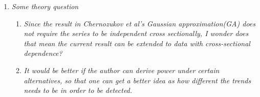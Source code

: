 \documentclass[a4paper,12pt]{article}
\begin{document}
\begin{enumerate}[label=(\arabic*),leftmargin=0.7cm]


  


\item \textit{Some theory question}

\begin{enumerate}[label=(\roman*)]
\item \textit{Since the result in Chernozukov et al's Gaussian approximation(GA) does not require the series to be independent cross sectionally, I wonder does that mean the current result can be extended to data with cross-sectional dependence?}
\item \textit{It would be better if the author can derive power under certain alternatives, so that one can get a better idea as how different the trends needs to be in order to be detected.}


\end{enumerate}
\end{enumerate}
\end{document}

